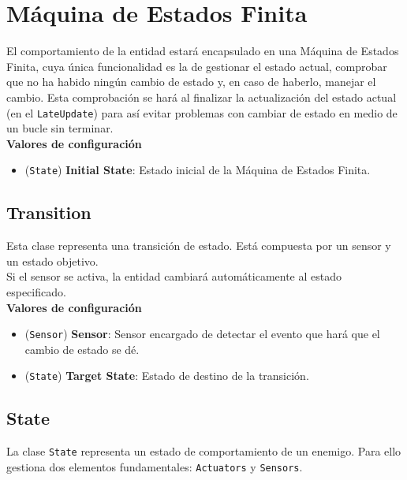 \section {Máquina de Estados Finita}

El comportamiento de la entidad estará encapsulado en una Máquina de Estados Finita, cuya única funcionalidad es la de gestionar el estado actual, comprobar que no ha habido ningún cambio de estado y, en caso de haberlo, manejar el cambio. Esta comprobación se hará al finalizar la actualización del estado actual (en el \texttt{LateUpdate}) para así evitar problemas con cambiar de estado en medio de un bucle sin terminar.\\

\textbf{Valores de configuración}
\begin{itemize}
	\item (\texttt{State}) \textbf{Initial State}: Estado inicial de la Máquina de Estados Finita.
\end{itemize}

\subsection{Transition}
Esta clase representa una transición de estado. Está compuesta por un sensor y un estado objetivo.\\

Si el sensor se activa, la entidad cambiará automáticamente al estado especificado.\\

\textbf{Valores de configuración}
\begin{itemize}
	\item (\texttt{Sensor}) \textbf{Sensor}: Sensor encargado de detectar el evento que hará que el cambio de estado se dé.
	\item (\texttt{State}) \textbf{Target State}: Estado de destino de la transición.
\end{itemize}

\subsection{State}

La clase \texttt{State} representa un estado de comportamiento de un enemigo. Para ello gestiona dos elementos fundamentales: \texttt{Actuators} y \texttt{Sensors}.\\

